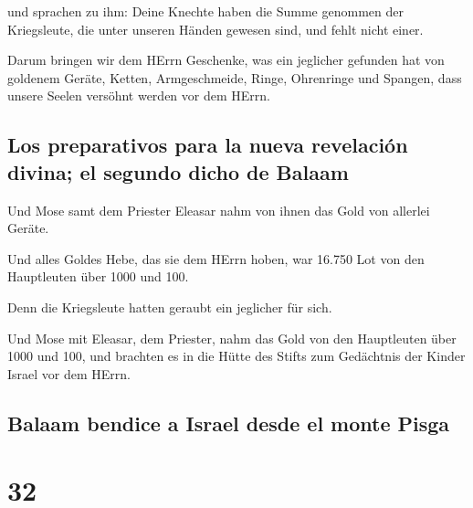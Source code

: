  und sprachen zu ihm: Deine Knechte haben die Summe
genommen der Kriegsleute, die unter unseren Händen gewesen sind, und
fehlt nicht einer.

 Darum bringen wir dem HErrn Geschenke, was ein jeglicher
gefunden hat von goldenem Geräte, Ketten, Armgeschmeide, Ringe,
Ohrenringe und Spangen, dass unsere Seelen versöhnt werden vor dem
HErrn.

\hypertarget{los-preparativos-para-la-nueva-revelaciuxf3n-divina-el-segundo-dicho-de-balaam}{%
\subsection{Los preparativos para la nueva revelación divina; el segundo
dicho de
Balaam}\label{los-preparativos-para-la-nueva-revelaciuxf3n-divina-el-segundo-dicho-de-balaam}}

 Und Mose samt dem Priester Eleasar nahm von ihnen das
Gold von allerlei Geräte.

 Und alles Goldes Hebe, das sie dem HErrn hoben, war
16.750 Lot von den Hauptleuten über 1000 und 100.

 Denn die Kriegsleute hatten geraubt ein jeglicher für
sich.

 Und Mose mit Eleasar, dem Priester, nahm das Gold von
den Hauptleuten über 1000 und 100, und brachten es in die Hütte des
Stifts zum Gedächtnis der Kinder Israel vor dem HErrn.

\hypertarget{balaam-bendice-a-israel-desde-el-monte-pisga}{%
\subsection{Balaam bendice a Israel desde el monte
Pisga}\label{balaam-bendice-a-israel-desde-el-monte-pisga}}

\hypertarget{section-31}{%
\section{32}\label{section-31}}

